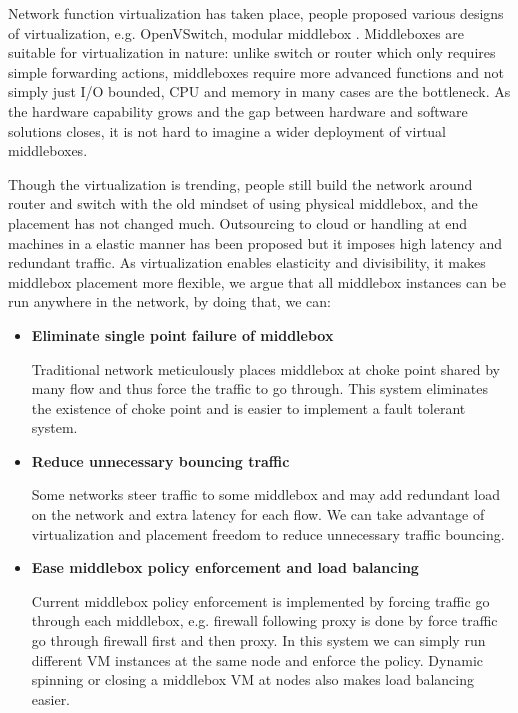 \documentclass{sig-alternate}
\begin{document}
Network function virtualization has taken place, people proposed various designs of virtualization, e.g. OpenVSwitch\cite{openvswitch}, modular middlebox\cite{COMB2012, clickos} . Middleboxes are suitable for virtualization in nature: unlike switch or router which only requires simple forwarding actions, middleboxes require more advanced functions and not simply just I/O bounded, CPU and memory in many cases are the bottleneck. As the hardware capability grows and the gap between hardware and software solutions closes, it is not hard to imagine a wider deployment of virtual middleboxes. 

Though the virtualization is trending, people still build the network around router and switch with the old mindset of using physical middlebox, and the placement has not changed much. Outsourcing to cloud or handling at end machines in a elastic manner has been proposed but it imposes high latency and redundant traffic\cite{APLOMB2012, ANANTA2013}. As virtualization enables elasticity and divisibility, it makes middlebox placement more flexible, we argue that all middlebox instances can be run anywhere in the network, by doing that, we can:
\begin{itemize}
  \item \textbf{Eliminate single point failure of middlebox}
  
  Traditional network meticulously places middlebox at choke point shared by many flow and thus force the traffic to go through. This system eliminates the existence of choke point and is easier to implement a fault tolerant system.
  
    \item \textbf{Reduce unnecessary bouncing traffic} 
  
  Some networks steer traffic to some middlebox and may add redundant load on the network and extra latency for each flow. We can take advantage of virtualization and placement freedom to reduce unnecessary traffic bouncing. 
  
  \item \textbf{Ease middlebox policy enforcement and load balancing}

Current middlebox policy enforcement is implemented by forcing traffic go through each middlebox, e.g. firewall following proxy is done by force traffic go through firewall first and then proxy. In this system we can simply run different VM instances at the same node and enforce the policy. Dynamic spinning or closing a middlebox VM at nodes also makes load balancing easier.
\end{itemize}
\end{document}
